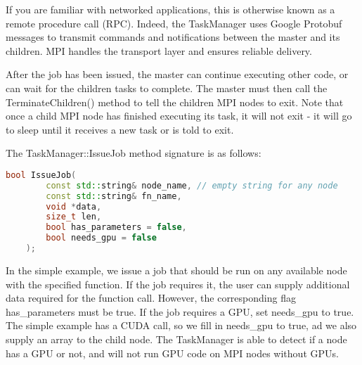 \documentclass[11pt]{article}
\begin{document}
            If you are familiar with networked applications, this is otherwise known as a remote procedure 
            call (RPC). Indeed, the TaskManager uses Google Protobuf messages to transmit commands and
            notifications between the master and its children. MPI handles the transport layer and ensures
            reliable delivery.
            
            After the job has been issued, the master can continue executing other code, or can wait for the
            children tasks to complete. The master must then call the TerminateChildren() method to tell the
            children MPI nodes to exit. Note that once a child MPI node has finished executing its task, it 
            will not exit - it will go to sleep until it receives a new task or is told to exit. 

            The TaskManager::IssueJob method signature is as follows:
            \begin{lstlisting}[language=C++]
    bool IssueJob(
        const std::string& node_name, // empty string for any node
        const std::string& fn_name,
        void *data,
        size_t len,
        bool has_parameters = false,
        bool needs_gpu = false
    );
            \end{lstlisting}
            
            In the simple example, we issue a job that should be run on any available node with the specified
            function. If the job requires it, the user can supply additional data required for the function
            call. However, the corresponding flag has\_parameters must be true. If the job requires a GPU, 
            set needs\_gpu to true. The simple example has a CUDA call, so we fill in needs\_gpu to true,
            ad we also supply an array to the child node. The TaskManager is able to detect if a node
            has a GPU or not, and will not run GPU code on MPI nodes without GPUs. 
            
\end{document}

